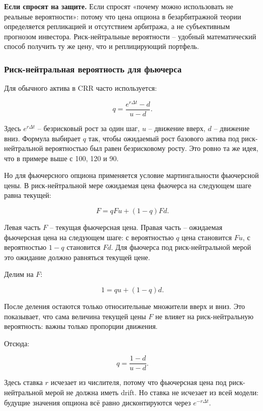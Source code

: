 \documentclass[11pt,a4paper]{article}
\newcommand{\answer}[1]{%
  \vspace{0.15em}
  \noindent\colorbox{softgreen}{%
    \parbox{\dimexpr\linewidth-2\fboxsep\relax}{\textbf{Если спросят на защите.} #1}%
  }\vspace{0.2em}
}
\begin{document}
\answer{Если спросят «почему можно использовать не реальные вероятности»: потому что цена опциона в безарбитражной теории определяется репликацией и отсутствием арбитража, а не субъективным прогнозом инвестора. Риск-нейтральные вероятности -- удобный математический способ получить ту же цену, что и реплицирующий портфель.}

\subsubsection{Риск-нейтральная вероятность для фьючерса}

Для обычного актива в CRR часто используется:

\begin{equation}
q=\frac{e^{r\Delta t}-d}{u-d}.
\end{equation}

Здесь $e^{r\Delta t}$ -- безрисковый рост за один шаг, $u$ -- движение вверх, $d$ -- движение вниз. Формула выбирает $q$ так, чтобы ожидаемый рост базового актива под риск-нейтральной вероятностью был равен безрисковому росту. Это ровно та же идея, что в примере выше с 100, 120 и 90.

Но для фьючерсного опциона применяется условие мартингальности фьючерсной цены. В риск-нейтральной мере ожидаемая цена фьючерса на следующем шаге равна текущей:

\begin{equation}
F = qFu + (1-q)Fd.
\end{equation}

Левая часть $F$ -- текущая фьючерсная цена. Правая часть -- ожидаемая фьючерсная цена на следующем шаге: с вероятностью $q$ цена становится $Fu$, с вероятностью $1-q$ становится $Fd$. Для фьючерса под риск-нейтральной мерой это ожидание должно равняться текущей цене.

Делим на $F$:

\begin{equation}
1 = qu+(1-q)d.
\end{equation}

После деления остаются только относительные множители вверх и вниз. Это показывает, что сама величина текущей цены $F$ не влияет на риск-нейтральную вероятность: важны только пропорции движения.

Отсюда:

\begin{equation}
q=\frac{1-d}{u-d}.
\end{equation}

Здесь ставка $r$ исчезает из числителя, потому что фьючерсная цена под риск-нейтральной мерой не должна иметь drift. Но ставка не исчезает из всей модели: будущие значения опциона всё равно дисконтируются через $e^{-r\Delta t}$.
\end{document}
